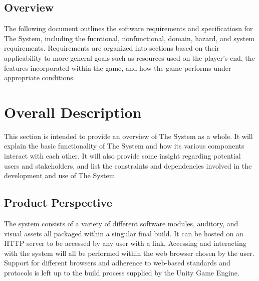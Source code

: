\documentclass[12pt]{report}
\begin{document}
	\subsection{Overview}
		The following document outlines the software requirements and specificatiosn for The System, including the fucntional, nonfunctional, domain, hazard, and system requirements. Requirements are organized into sections based on their applicability to more general goals such as resources used on the player's end, the features incorporated within the game, and how the game performs under appropriate conditions.

\section{Overall Description}
	This section is intended to provide an overview of The System as a whole. It will explain the basic functionality of The System and how its various components interact with each other. It will also provide some insight regarding potential users and stakeholders, and list the constraints and dependencies involved in the development and use of The System.
	\subsection{Product Perspective}
		The system consists of a variety of different software modules, auditory, and visual assets all packaged within a singular final build. It can be hosted on an HTTP server to be accessed by any user with a link. Accessing and interacting with the system will all be performed within the web browser chosen by the user. Support for different browsers and adherence to web-based standards and protocols is left up to the build process supplied by the Unity Game Engine.
\end{document}
